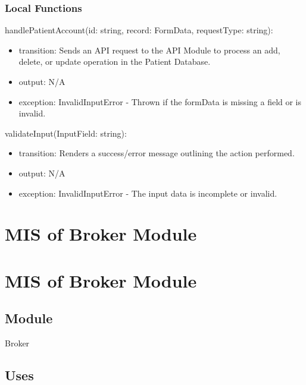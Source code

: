 \documentclass[12pt, titlepage]{article}
\begin{document}
\subsubsection{Local Functions}

\noindent handlePatientAccount(id: string, record: FormData, requestType: string):
\begin{itemize}
\item transition: Sends an API request to the API Module to process an add, delete, or update operation in the Patient Database.
\item output: N/A
\item exception: InvalidInputError - Thrown if the formData is missing a field or is invalid.
\end{itemize}

\noindent validateInput(InputField: string):
\begin{itemize}
\item transition: Renders a success/error message outlining the action performed.
\item output: N/A
\item exception: InvalidInputError - The input data is incomplete or invalid.
\end{itemize}

\newpage

\section{MIS of Broker Module } \label{Module_Broker}
\section{MIS of Broker Module } \label{Module_Broker}

\subsection{Module}
Broker

\subsection{Uses}
\end{document}
